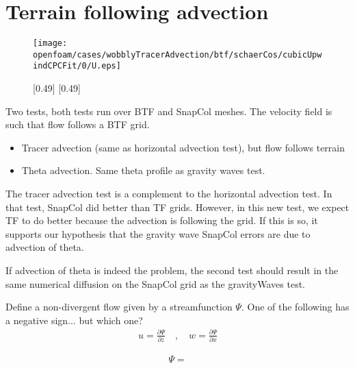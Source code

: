 \section{Terrain following advection}

\begin{figure}
	\centering
	\texttt{[image: openfoam/cases/wobblyTracerAdvection/btf/schaerCos/cubicUpwindCPCFit/0/U.eps]}
	\caption{}
	\label{fig:wobblyTracer:u}
\end{figure}

\begin{figure}
	\captionsetup[subfigure]{position=b}
	\centering
	[0.49\textwidth]{}
	\hfill
	[0.49\textwidth]{}
%
	\caption{}
\end{figure}

Two tests, both tests run over BTF and SnapCol meshes.  The velocity field is such that flow follows a BTF grid.
\begin{itemize}
\item Tracer advection (same as horizontal advection test), but flow follows terrain
\item Theta advection.  Same theta profile as gravity waves test.  
\end{itemize}

The tracer advection test is a complement to the horizontal advection test.  In that test, SnapCol did better than TF grids.  However, in this new test, we expect TF to do better because the advection is following the grid.  If this is so, it supports our hypothesis that the gravity wave SnapCol errors are due to advection of theta.

If advection of theta is indeed the problem, the second test should result in the same numerical diffusion on the SnapCol grid as the gravityWaves test.

Define a non-divergent flow given by a streamfunction $\Psi$.  One of the following has a negative sign... but which one?
\begin{align}
u = \frac{\partial \Psi}{\partial z} \quad,\quad w = \frac{\partial \Psi}{\partial x}
\end{align}

\begin{align}
\Psi = 
\end{align}
